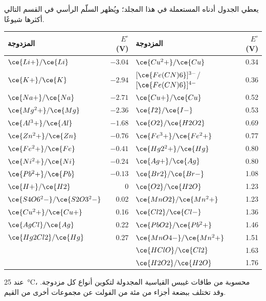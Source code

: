 يعطي الجدول أدناه  المستعملة في هذا المجلد؛ ويُظهر
السلّم الرأسي في القسم التالي أكثرها شيوعًا.

\begin{omfigure}
\begin{tabular}{lr@{\qquad}lr}
\hline
المزدوجة & $E^\circ$ (V) & المزدوجة & $E^\circ$ (V) \\
\hline
$\ce{Li+}/\ce{Li}$ & $-3.04$ & $\ce{Cu^2+}/\ce{Cu}$ & 0.34 \\
$\ce{K+}/\ce{K}$ & $-2.94$ & $[\ce{Fe(CN)6}]^{3-}$/$[\ce{Fe(CN)6}]^{4-}$ & 0.36 \\
$\ce{Na+}/\ce{Na}$ & $-2.71$ & $\ce{Cu+}/\ce{Cu}$ & 0.52 \\
$\ce{Mg^2+}/\ce{Mg}$ & $-2.36$ & $\ce{I2}/\ce{I-}$ & 0.53 \\
$\ce{Al^3+}/\ce{Al}$ & $-1.68$ & $\ce{O2}/\ce{H2O2}$ & 0.69 \\
$\ce{Zn^2+}/\ce{Zn}$ & $-0.76$ & $\ce{Fe^3+}/\ce{Fe^2+}$ & 0.77 \\
$\ce{Fe^2+}/\ce{Fe}$ & $-0.41$ & $\ce{Hg2^2+}/\ce{Hg}$ & 0.80 \\
$\ce{Ni^2+}/\ce{Ni}$ & $-0.24$ & $\ce{Ag+}/\ce{Ag}$ & 0.80 \\
$\ce{Pb^2+}/\ce{Pb}$ & $-0.13$ & $\ce{Br2}/\ce{Br-}$ & 1.08 \\
$\ce{H+}/\ce{H2}$ & 0 & $\ce{O2}/\ce{H2O}$ & 1.23 \\
$\ce{S4O6^2-}/\ce{S2O3^2-}$ & 0.02 & $\ce{MnO2}/\ce{Mn^2+}$ & 1.23 \\
$\ce{Cu^2+}/\ce{Cu+}$ & 0.16 & $\ce{Cl2}/\ce{Cl-}$ & 1.36 \\
$\ce{AgCl}/\ce{Ag}$ & 0.22 & $\ce{PbO2}/\ce{Pb^2+}$ & 1.46 \\
$\ce{Hg2Cl2}/\ce{Hg}$ & 0.27 & $\ce{MnO4-}/\ce{Mn^2+}$ & 1.51 \\
 & & $\ce{HClO}/\ce{Cl2}$ & 1.63 \\
 & & $\ce{H2O2}/\ce{H2O}$ & 1.76 \\
\hline
\end{tabular}

\smallskip
{\small {} عند \qty{25}{\celsius}، محسوبة من
طاقات غيبس القياسية المجدولة لتكوين أنواع كل
مزدوجة. وقد تختلف ببضعة أجزاء من مئة من الفولت عن
مجموعات أخرى من القيم.}
\end{omfigure}

